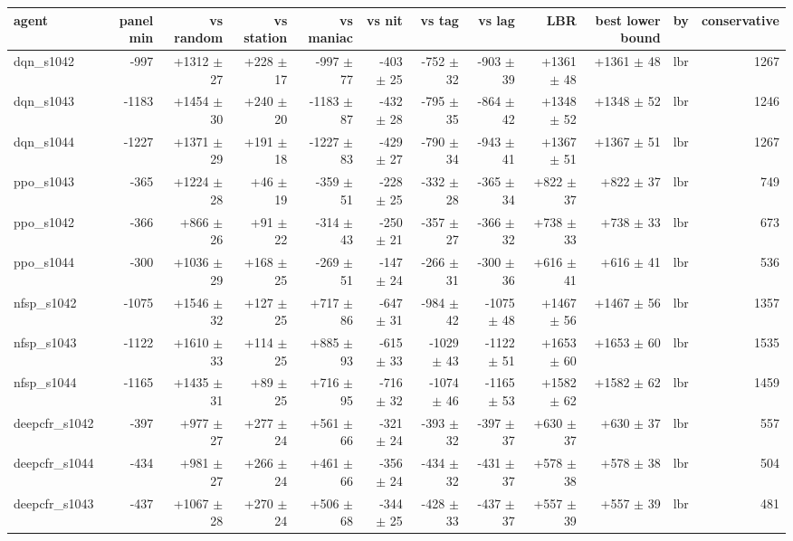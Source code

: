 \begin{tabular}{lrrrrrrrrrrr}
\toprule
agent & panel min & vs random & vs station & vs maniac & vs nit & vs tag & vs lag & LBR & best lower bound & by & conservative \\
\midrule
dqn\_s1042 & -997 & +1312 $\pm$ 27 & +228 $\pm$ 17 & -997 $\pm$ 77 & -403 $\pm$ 25 & -752 $\pm$ 32 & -903 $\pm$ 39 & +1361 $\pm$ 48 & +1361 $\pm$ 48 & lbr & 1267 \\
dqn\_s1043 & -1183 & +1454 $\pm$ 30 & +240 $\pm$ 20 & -1183 $\pm$ 87 & -432 $\pm$ 28 & -795 $\pm$ 35 & -864 $\pm$ 42 & +1348 $\pm$ 52 & +1348 $\pm$ 52 & lbr & 1246 \\
dqn\_s1044 & -1227 & +1371 $\pm$ 29 & +191 $\pm$ 18 & -1227 $\pm$ 83 & -429 $\pm$ 27 & -790 $\pm$ 34 & -943 $\pm$ 41 & +1367 $\pm$ 51 & +1367 $\pm$ 51 & lbr & 1267 \\
ppo\_s1043 & -365 & +1224 $\pm$ 28 & +46 $\pm$ 19 & -359 $\pm$ 51 & -228 $\pm$ 25 & -332 $\pm$ 28 & -365 $\pm$ 34 & +822 $\pm$ 37 & +822 $\pm$ 37 & lbr & 749 \\
ppo\_s1042 & -366 & +866 $\pm$ 26 & +91 $\pm$ 22 & -314 $\pm$ 43 & -250 $\pm$ 21 & -357 $\pm$ 27 & -366 $\pm$ 32 & +738 $\pm$ 33 & +738 $\pm$ 33 & lbr & 673 \\
ppo\_s1044 & -300 & +1036 $\pm$ 29 & +168 $\pm$ 25 & -269 $\pm$ 51 & -147 $\pm$ 24 & -266 $\pm$ 31 & -300 $\pm$ 36 & +616 $\pm$ 41 & +616 $\pm$ 41 & lbr & 536 \\
nfsp\_s1042 & -1075 & +1546 $\pm$ 32 & +127 $\pm$ 25 & +717 $\pm$ 86 & -647 $\pm$ 31 & -984 $\pm$ 42 & -1075 $\pm$ 48 & +1467 $\pm$ 56 & +1467 $\pm$ 56 & lbr & 1357 \\
nfsp\_s1043 & -1122 & +1610 $\pm$ 33 & +114 $\pm$ 25 & +885 $\pm$ 93 & -615 $\pm$ 33 & -1029 $\pm$ 43 & -1122 $\pm$ 51 & +1653 $\pm$ 60 & +1653 $\pm$ 60 & lbr & 1535 \\
nfsp\_s1044 & -1165 & +1435 $\pm$ 31 & +89 $\pm$ 25 & +716 $\pm$ 95 & -716 $\pm$ 32 & -1074 $\pm$ 46 & -1165 $\pm$ 53 & +1582 $\pm$ 62 & +1582 $\pm$ 62 & lbr & 1459 \\
deepcfr\_s1042 & -397 & +977 $\pm$ 27 & +277 $\pm$ 24 & +561 $\pm$ 66 & -321 $\pm$ 24 & -393 $\pm$ 32 & -397 $\pm$ 37 & +630 $\pm$ 37 & +630 $\pm$ 37 & lbr & 557 \\
deepcfr\_s1044 & -434 & +981 $\pm$ 27 & +266 $\pm$ 24 & +461 $\pm$ 66 & -356 $\pm$ 24 & -434 $\pm$ 32 & -431 $\pm$ 37 & +578 $\pm$ 38 & +578 $\pm$ 38 & lbr & 504 \\
deepcfr\_s1043 & -437 & +1067 $\pm$ 28 & +270 $\pm$ 24 & +506 $\pm$ 68 & -344 $\pm$ 25 & -428 $\pm$ 33 & -437 $\pm$ 37 & +557 $\pm$ 39 & +557 $\pm$ 39 & lbr & 481 \\

\end{tabular}
